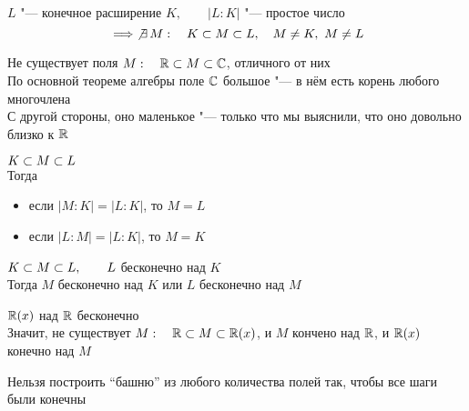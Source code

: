 \begin{implication}
	$ L $ "--- конечное расширение $ K, \qquad |L : K| $ "--- простое число
	$$ \implies \not\exists\, M : \quad K \subset M \subset L, \quad M \ne K, ~ M \ne L $$
\end{implication}

\begin{eg}
	Не существует поля $ M : \quad \mathbb{R} \subset M \subset \mathbb{C} $, отличного от них \\
	По основной теореме алгебры поле $ \mathbb{C} $ большое "--- в нём есть корень любого многочлена \\
	С другой стороны, оно маленькое "--- только что мы выяснили, что оно довольно близко к $ \mathbb{R} $
\end{eg}

\begin{implication}
	$ K \subset M \subset L $ \\
	Тогда
	\begin{itemize}
		\item если $ |M : K| = |L : K| $, то $ M = L $
		\item если $ |L : M| = |L : K| $, то $ M = K $
	\end{itemize}
\end{implication}

\begin{implication}
	$ K \subset M \subset L, \qquad L $ бесконечно над $ K $ \\
	Тогда $ M $ бесконечно над $ K $ или $ L $ бесконечно над $ M $
\end{implication}

\begin{eg}
	$ \mathbb{R}(x) $ над $ \mathbb{R} $ бесконечно \\
	Значит, не существует $ M : \quad \mathbb{R} \subset M \subset \mathbb{R}(x) $, и $ M $ кончено над $ \mathbb{R} $, и $ \mathbb{R}(x) $ конечно над $ M $
\end{eg}

\begin{remark}
	Нельзя построить ``башню'' из любого количества полей так, чтобы все шаги были конечны
\end{remark}
